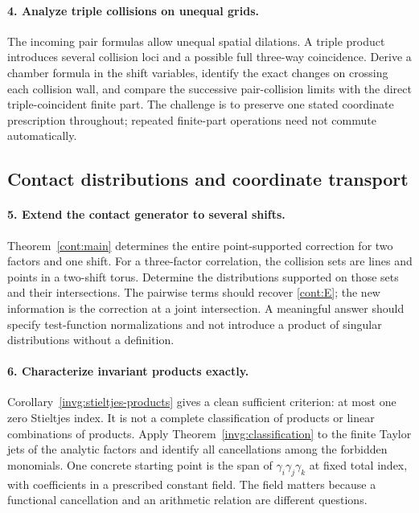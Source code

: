 \paragraph{4. Analyze triple collisions on unequal grids.}
The incoming pair formulas allow unequal spatial dilations.
A triple product introduces several collision loci and a possible
full three-way coincidence. Derive a chamber formula in the shift
variables, identify the exact changes on crossing each collision
wall, and compare the successive pair-collision limits with the
direct triple-coincident finite part. The challenge is to preserve
one stated coordinate prescription throughout; repeated finite-part
operations need not commute automatically.

\subsection{Contact distributions and coordinate transport}

\paragraph{5. Extend the contact generator to several shifts.}
Theorem~\ref{cont:main} determines the entire point-supported
correction for two factors and one shift. For a three-factor
correlation, the collision sets are lines and points in a two-shift
torus. Determine the distributions supported on those sets and their
intersections. The pairwise terms should recover
\eqref{cont:E}; the new information is the correction at a joint
intersection. A meaningful answer should specify test-function
normalizations and not introduce a product of singular
distributions without a definition.

\paragraph{6. Characterize invariant products exactly.}
Corollary~\ref{invg:stieltjes-products} gives a clean sufficient
criterion: at most one zero Stieltjes index. It is not a complete
classification of products or linear combinations of products.
Apply Theorem~\ref{invg:classification} to the finite Taylor jets of
the analytic factors and identify all cancellations among the
forbidden monomials. One concrete starting point is the span of
$\gamma_i\gamma_j\gamma_k$ at fixed total index, with coefficients
in a prescribed constant field. The field matters because a
functional cancellation and an arithmetic relation are different
questions.

